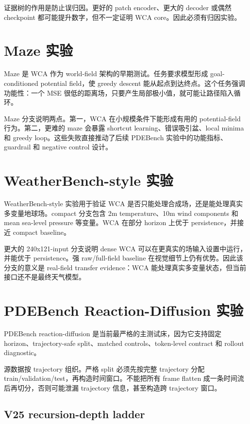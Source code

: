 \documentclass[11pt]{article}
\begin{document}
证据树的作用是防止误归因。更好的 patch encoder、更大的 decoder 或偶然 checkpoint 都可能提升数字，但不一定证明 WCA core。因此必须有归因实验。

\section{Maze 实验}

Maze 是 WCA 作为 world-field 架构的早期测试。任务要求模型形成 goal-conditioned potential field，使 greedy descent 能从起点到达终点。这个任务强调功能性：一个 MSE 很低的距离场，只要产生局部极小值，就可能让路径陷入循环。

Maze 分支说明两点。第一，WCA 在小规模条件下能形成有用的 potential-field 行为。第二，更难的 maze 会暴露 shortcut learning、错误吸引盆、local minima 和 greedy loop。这些失败直接推动了后续 PDEBench 实验中的功能指标、guardrail 和 negative control 设计。

\section{WeatherBench-style 实验}

WeatherBench-style 实验用于验证 WCA 是否只能处理合成场，还是能处理真实多变量地球场。compact 分支包含 2m temperature、10m wind components 和 mean sea-level pressure 等变量。WCA 在部分 horizon 上优于 persistence，并接近 compact baseline。

更大的 240x121-input 分支说明 dense WCA 可以在更真实的场输入设置中运行，并能优于 persistence。强 raw/full-field baseline 在视觉细节上仍有优势。因此该分支的意义是 real-field transfer evidence：WCA 能处理真实多变量状态，但当前接口还不是最终天气模型。

\section{PDEBench Reaction-Diffusion 实验}

PDEBench reaction-diffusion 是当前最严格的主测试床，因为它支持固定 horizon、trajectory-safe split、matched controls、token-level contract 和 rollout diagnostic。

源数据按 trajectory 组织。严格 split 必须先按完整 trajectory 分配 train/validation/test，再构造时间窗口。不能把所有 frame flatten 成一条时间流后再切分，否则可能泄漏 trajectory 信息，甚至构造跨 trajectory 窗口。

\subsection{V25 recursion-depth ladder}
\end{document}
